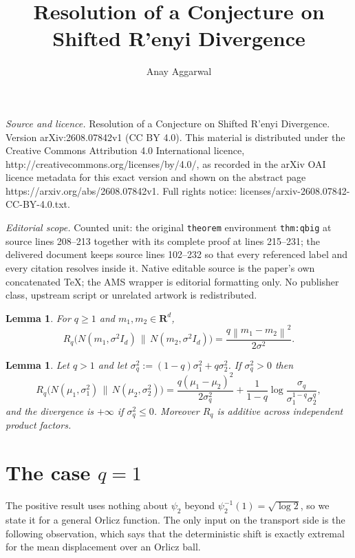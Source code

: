 \documentclass[10pt,a4paper]{amsart}
\newtheorem{lemma}[theorem]{Lemma}
\def\R{\mathbf{R}}
\newcommand{\norm}[1]{\left\lVert#1\right\rVert}
\numberwithin{equation}{section}
\begin{document}
\title[Resolution of a Conjecture on Shifted R'enyi Divergence]{Resolution of a Conjecture on Shifted R'enyi Divergence}
\author{Anay Aggarwal}
\date{}
\maketitle
\noindent\emph{Source and licence.} Resolution of a Conjecture on Shifted R'enyi Divergence. Version arXiv:2608.07842v1 (CC BY 4.0). This material is distributed under the Creative Commons Attribution 4.0 International licence, http://creativecommons.org/licenses/by/4.0/, as recorded in the arXiv OAI licence metadata for this exact version and shown on the abstract page https://arxiv.org/abs/2608.07842v1. Full rights notice: licenses/arxiv-2608.07842-CC-BY-4.0.txt.\par\smallskip
\noindent\textit{Editorial scope.} Counted unit: the original \texttt{theorem} environment \texttt{thm:qbig} at source lines 208--213 together with its complete proof at lines 215--231; the delivered document keeps source lines 102--232 so that every referenced label and every citation resolves inside it. Native editable source is the paper's own concatenated TeX; the AMS wrapper is editorial formatting only. No publisher class, upstream script or unrelated artwork is redistributed.
\begin{lemma}\label{lem:gauss}
For $q\ge 1$ and $m_1,m_2\in\R^d$,
$$R_q\big(N(m_1,\sigma^2I_d)\,\big\|\,N(m_2,\sigma^2I_d)\big)=\frac{q\norm{m_1-m_2}^2}{2\sigma^2}.$$
\end{lemma}

\begin{lemma}\label{lem:veh}
Let $q>1$ and let $\sigma_q^2:=(1-q)\sigma_1^2+q\sigma_2^2$. If $\sigma_q^2>0$ then
$$R_q\big(N(\mu_1,\sigma_1^2)\,\big\|\,N(\mu_2,\sigma_2^2)\big)=\frac{q(\mu_1-\mu_2)^2}{2\sigma_q^2}+\frac{1}{1-q}\log\frac{\sigma_q}{\sigma_1^{1-q}\sigma_2^{q}},$$
and the divergence is $+\infty$ if $\sigma_q^2\le 0$. Moreover $R_q$ is additive across independent product factors.
\end{lemma}

\section{The case \texorpdfstring{$q=1$}{q=1}}

The positive result uses nothing about $\psi_2$ beyond $\psi_2^{-1}(1)=\sqrt{\log 2}$, so we state it for a general Orlicz function. The only input on the transport side is the following observation, which says that the deterministic shift is exactly extremal for the mean displacement over an Orlicz ball.
\end{document}
